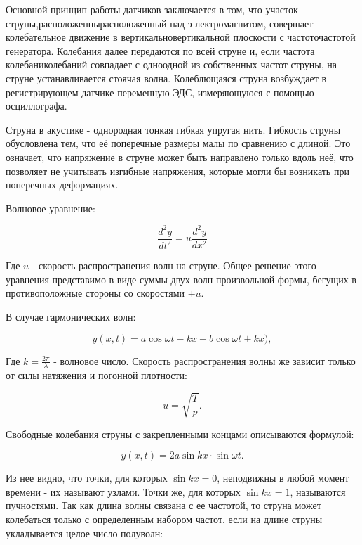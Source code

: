 \documentclass[a4paper,12pt]{report}
\begin{document}
Основной принцип работы датчиков заключается в том, что участок струны,расположеннырасположенный над э лектромагнитом, совершает колебательное движение в вертикальновертикальной плоскости с частоточастотой генератора. Колебания далее передаются по всей струне и, если частота колебаниколебаний совпадает с одноодной из собственных частот струны, на струне устанавливается стоячая волна. Колеблющаяся струна возбуждает в регистрирующем датчике переменную ЭДС, измеряющуюся с помощью осциллографа.

Струна в акустике - однородная тонкая гибкая упругая нить. Гибкость струны обусловлена тем, что её поперечные размеры малы по сравнению с длиной. Это означает, что напряжение в струне может быть направлено только вдоль неё, что позволяет не учитывать изгибные напряжения, которые могли бы возникать при поперечных деформациях.

Волновое уравнение:

\begin{equation}\label{difur}
	\frac{d^2y}{dt^2}=u\frac{d^2y}{dx^2}
\end{equation}

Где $u$ - скорость распространения волн на струне. Общее решение этого уравнения представимо в виде суммы двух волн произвольной формы, бегущих в противоположные стороны со скоростями $\pm u$.

В случае гармонических волн:

\begin{equation}
	y(x,t)=a\cos{\omega t-kx} + b\cos{\omega t + kx)},
\end{equation}

Где $k=\frac{2\pi}{\lambda}$ - волновое число. Скорость распространения волны же зависит только от силы натяжения и погонной плотности:

\begin{equation} \label{skor}
	u=\sqrt{\frac{T}{p}}.
\end{equation}

Свободные колебания струны с закрепленными концами описываются формулой:

\begin{equation}
	y(x,t)=2a\sin{kx}\cdot\sin{\omega t}.
\end{equation}

Из нее видно, что точки, для которых $\sin{kx}=0$, неподвижны в любой момент времени - их называют узлами. Точки же, для которых $\sin{kx}=1$, называются пучностями. Так как длина волны связана с ее частотой, то струна может колебаться только с определенным набором частот, если на длине струны укладывается целое число полуволн:
\end{document}
